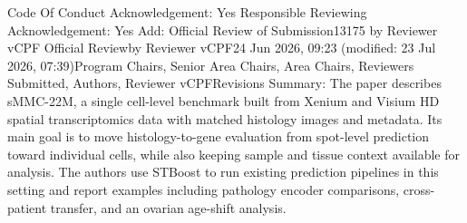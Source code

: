 Code Of Conduct Acknowledgement: Yes
Responsible Reviewing Acknowledgement: Yes
Add:
Official Review of Submission13175 by Reviewer vCPF
Official Reviewby Reviewer vCPF24 Jun 2026, 09:23 (modified: 23 Jul 2026, 07:39)Program Chairs, Senior Area Chairs, Area Chairs, Reviewers Submitted, Authors, Reviewer vCPFRevisions
Summary:
The paper describes sMMC-22M, a single cell-level benchmark built from Xenium and Visium HD spatial transcriptomics data with matched histology images and metadata. Its main goal is to move histology-to-gene evaluation from spot-level prediction toward individual cells, while also keeping sample and tissue context available for analysis. The authors use STBoost to run existing prediction pipelines in this setting and report examples including pathology encoder comparisons, cross-patient transfer, and an ovarian age-shift analysis.

